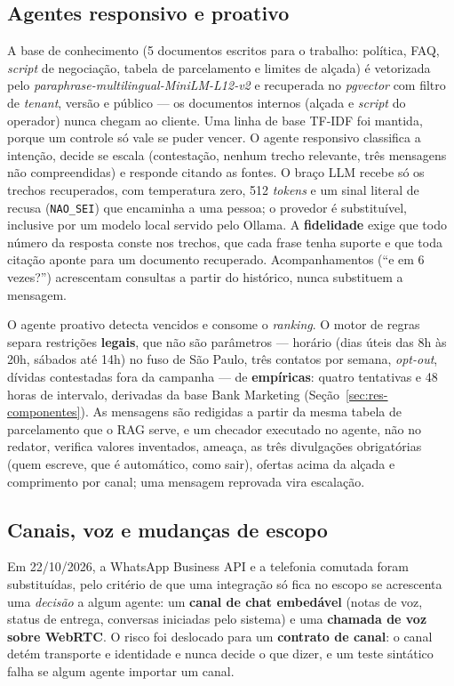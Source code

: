 \documentclass[portuguese]{sbcreviews-2025}%
\begin{document}
\subsection{Agentes responsivo e proativo}
\label{sec:responsivo}

A base de conhecimento (5 documentos escritos para o trabalho: política, FAQ, \textit{script} de negociação, tabela de parcelamento e limites de alçada) é vetorizada pelo \textit{paraphrase-multilingual-MiniLM-L12-v2} \cite{reimers2019sentence} e recuperada no \textit{pgvector} com filtro de \textit{tenant}, versão e público --- os documentos internos (alçada e \textit{script} do operador) nunca chegam ao cliente. Uma linha de base TF-IDF foi mantida, porque um controle só vale se puder vencer. O agente responsivo classifica a intenção, decide se escala (contestação, nenhum trecho relevante, três mensagens não compreendidas) e responde citando as fontes. O braço LLM recebe só os trechos recuperados, com temperatura zero, 512 \textit{tokens} e um sinal literal de recusa (\texttt{NAO\_SEI}) que encaminha a uma pessoa; o provedor é substituível, inclusive por um modelo local servido pelo Ollama. A \textbf{fidelidade} exige que todo número da resposta conste nos trechos, que cada frase tenha suporte e que toda citação aponte para um documento recuperado. Acompanhamentos (``e em 6 vezes?'') acrescentam consultas a partir do histórico, nunca substituem a mensagem.

O agente proativo detecta vencidos e consome o \textit{ranking}. O motor de regras separa restrições \textbf{legais}, que não são parâmetros --- horário (dias úteis das 8h às 20h, sábados até 14h) no fuso de São Paulo, três contatos por semana, \textit{opt-out}, dívidas contestadas fora da campanha \cite{cdc1990,lei14181} --- de \textbf{empíricas}: quatro tentativas e 48 horas de intervalo, derivadas da base Bank Marketing (Seção~\ref{sec:res-componentes}). As mensagens são redigidas a partir da mesma tabela de parcelamento que o RAG serve, e um checador executado no agente, não no redator, verifica valores inventados, ameaça, as três divulgações obrigatórias (quem escreve, que é automático, como sair), ofertas acima da alçada e comprimento por canal; uma mensagem reprovada vira escalação.

\subsection{Canais, voz e mudanças de escopo}
\label{sec:canais}

Em 22/10/2026, a WhatsApp Business API e a telefonia comutada foram substituídas, pelo critério de que uma integração só fica no escopo se acrescenta uma \textit{decisão} a algum agente: um \textbf{canal de chat embedável} (notas de voz, status de entrega, conversas iniciadas pelo sistema) e uma \textbf{chamada de voz sobre WebRTC}. O risco foi deslocado para um \textbf{contrato de canal}: o canal detém transporte e identidade e nunca decide o que dizer, e um teste sintático falha se algum agente importar um canal.
\end{document}
